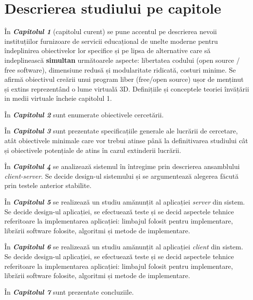 \section{Descrierea studiului pe capitole}
\par În \textbf{\textit{Capitolul 1}} (capitolul curent) se pune accentul pe descrierea nevoii instituțiilor furnizoare de servicii educațional de unelte moderne pentru îndeplinirea obiectivelor lor specifice și pe lipsa de alternative care să indeplinească  \textbf{simultan} următoarele aspecte: libertatea codului (open source / free software), dimensiune redusă și modularitate ridicată, costuri minime. Se afirmă obiectivul creării unui program liber (free/open source) ușor de menținut și extins reprezentând o lume virtuală 3D. Definițiile și conceptele teoriei învățării in medii virtuale încheie capitolul 1.
\par În \textbf{\textit{Capitolul 2}} sunt enumerate obiectivele cercetării.
\par În \textbf{\textit{Capitolul 3}} sunt prezentate specificațiile generale ale lucrării de cercetare, atât obiectivele minimale care vor trebui atinse până la definitivarea studiului cât și obiectivele potențiale de atins în cazul extinderii lucrării.
\par În \textbf{\textit{Capitolul 4}} se analizează sistemul în întregime prin descrierea ansamblului \textit{client-server}. Se decide design-ul  sistemului și se argumentează alegerea făcută prin testele anterior stabilite.
\par În \textbf{\textit{Capitolul 5}} se realizează un studiu amănunțit al aplicației \textit{server} din sistem. Se decide design-ul aplicației, se efectuează teste și se decid aspectele tehnice referitoare la implementarea aplicației: limbajul folosit pentru implementare, librării software folosite, algoritmi și metode de implementare.
\par În \textbf{\textit{Capitolul 6}} se realizează un studiu amănunțit al aplicației \textit{client} din sistem. Se decide design-ul aplicației, se efectuează teste și se decid aspectele tehnice referitoare la implementarea aplicației: limbajul folosit pentru implementare, librării software folosite, algoritmi și metode de implementare.
\par În \textbf{\textit{Capitolul 7}} sunt prezentate concluziile.
